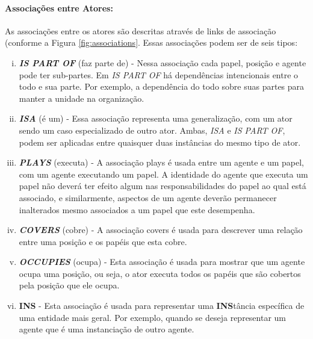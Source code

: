             \paragraph{Associações entre Atores:}
                As associações entre os atores são descritas através de links de associação (conforme a Figura \ref{fig:associations}.
                Essas associações podem ser de seis tipos:

                \begin{enumerate}[i.]
                    \item \textbf{\emph{IS PART OF}} (faz parte de) - Nessa associação cada papel, posição e agente pode ter sub-partes. Em \emph{IS PART OF} há dependências intencionais entre o todo e sua parte. Por exemplo, a dependência do todo sobre suas partes para manter a unidade na organização.

                    \item \textbf{\emph{ISA}} (é um) - Essa associação representa uma generalização, com um ator sendo um caso especializado de outro ator. Ambas, \emph{ISA} e \emph{IS PART OF}, podem ser aplicadas entre quaisquer duas instâncias do mesmo tipo de ator.
                    
                    \item \textbf{\emph{PLAYS}} (executa) - A associação plays é usada entre um agente e um papel, com um agente executando um papel. A identidade do agente que executa um papel não deverá ter efeito algum nas responsabilidades do papel ao qual está associado, e similarmente, aspectos de um agente deverão permanecer inalterados mesmo associados a um papel que este desempenha.
                    
                    \item \textbf{\emph{COVERS}} (cobre) - A associação covers é usada para descrever uma relação entre uma posição e os papéis que esta cobre.
                    
                    \item \textbf{\emph{OCCUPIES}} (ocupa) - Esta associação é usada para mostrar que um agente ocupa uma posição, ou seja, o ator executa todos os papéis que são cobertos pela posição que ele ocupa.
                    
                    \item \textbf{INS} - Esta associação é usada para representar uma \textbf{INS}tância específica de uma entidade mais geral. Por exemplo, quando se deseja representar um agente que é uma instanciação de outro agente.
                \end{enumerate}
